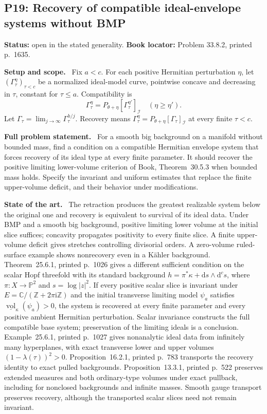 \documentclass[11pt]{article}
\newcommand{\dc}{\mathrm d^c}
\newcommand{\field}[1]{\par\medskip\noindent\textbf{#1.}\ }
\begin{document}
\subsection{P19: Recovery of compatible ideal-envelope systems without BMP}
\label{P19}
\noindent\textbf{Status:} open in the stated generality. \textbf{Book locator:} Problem 33.8.2, printed p.~1635.
\field{Setup and scope} Fix $a<c$. For each positive Hermitian perturbation $\eta$, let $(\Gamma^\eta_\tau)_{\tau<c}$ be a normalized ideal-model curve, pointwise concave and decreasing in $\tau$, constant for $\tau\leq a$. Compatibility is
\[\Gamma^\eta_\tau=P_{\theta+\eta}[\Gamma^{\eta'}_\tau]_{\mathcal I}\quad(\eta\geq\eta').\]
Let $\Gamma_\tau=\lim_{j\to\infty}\Gamma^{h/j}_\tau$. Recovery means $\Gamma^\eta_\tau=P_{\theta+\eta}[\Gamma_\tau]_{\mathcal I}$ at every finite $\tau<c$.
\field{Full problem statement} For a smooth big background on a manifold without bounded mass, find a condition on a compatible Hermitian envelope system that forces recovery of its ideal type at every finite parameter. It should recover the positive limiting lower-volume criterion of Book, Theorem~30.5.3 when bounded mass holds. Specify the invariant and uniform estimates that replace the finite upper-volume deficit, and their behavior under modifications.
\field{State of the art} The retraction produces the greatest realizable system below the original one and recovery is equivalent to survival of its ideal data. Under BMP and a smooth big background, positive limiting lower volume at the initial slice suffices; concavity propagates positivity to every finite slice. A finite upper-volume deficit gives stretches controlling divisorial orders. A zero-volume ruled-surface example shows nonrecovery even in a K\"ahler background. Theorem~25.6.1, printed p.~1026 gives a different sufficient condition on the scalar Hopf threefold with its standard background $h=\pi^*\kappa+\mathrm ds\wedge\dc s$, where $\pi:X\to\mathbb P^2$ and $s=\log|z|^2$. If every positive scalar slice is invariant under $E=\mathbb C/(\mathbb Z+2\pi\mathrm i\mathbb Z)$ and the initial transverse limiting model $\psi_a$ satisfies $\underline{\operatorname{vol}}_\kappa(\psi_a)>0$, the system is recovered at every finite parameter and every positive ambient Hermitian perturbation. Scalar invariance constructs the full compatible base system; preservation of the limiting ideals is a conclusion. Example~25.6.1, printed p.~1027 gives nonanalytic ideal data from infinitely many hyperplanes, with exact transverse lower and upper volumes $(1-\lambda(\tau))^2>0$. Proposition~16.2.1, printed p.~783 transports the recovery identity to exact pulled backgrounds. Proposition~13.3.1, printed p.~522 preserves extended measures and both ordinary-type volumes under exact pullback, including for nonclosed backgrounds and infinite masses. Smooth gauge transport preserves recovery, although the transported scalar slices need not remain invariant.
\end{document}
